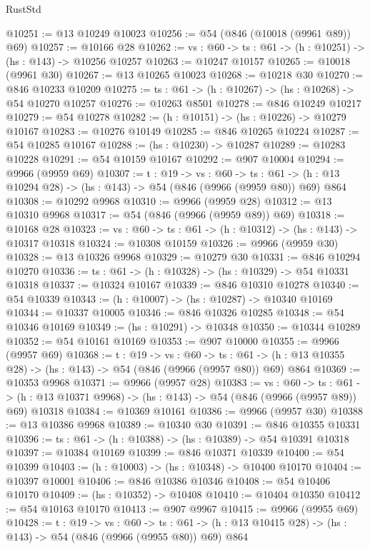 \begin{lexlean}{RustStd}
\begin{coremodule}
@10251 := @13 @10249 @10023
@10256 := @54 (@846 (@10018 (@9961 @89)) @69)
@10257 := @10166 @28
@10262 := {vs : @60} -> {ts : @61} -> (h : @10251) -> (hs : @143) -> @10256 @10257
@10263 := @10247 @10157
@10265 := @10018 (@9961 @30)
@10267 := @13 @10265 @10023
@10268 := @10218 @30
@10270 := @846 @10233 @10209
@10275 := {ts : @61} -> (h : @10267) -> (hs : @10268) -> @54 @10270 @10257
@10276 := @10263 @8501
@10278 := @846 @10249 @10217
@10279 := @54 @10278
@10282 := (h : @10151) -> (hs : @10226) -> @10279 @10167
@10283 := @10276 @10149
@10285 := @846 @10265 @10224
@10287 := @54 @10285 @10167
@10288 := (hs : @10230) -> @10287
@10289 := @10283 @10228
@10291 := @54 @10159 @10167
@10292 := @907 @10004
@10294 := @9966 (@9959 @69)
@10307 := {t : @19} ->
  {vs : @60} ->
  {ts : @61} -> (h : @13 @10294 @28) -> (hs : @143) -> @54 (@846 (@9966 (@9959 @80)) @69) @864
@10308 := @10292 @9968
@10310 := @9966 (@9959 @28)
@10312 := @13 @10310 @9968
@10317 := @54 (@846 (@9966 (@9959 @89)) @69)
@10318 := @10168 @28
@10323 := {vs : @60} -> {ts : @61} -> (h : @10312) -> (hs : @143) -> @10317 @10318
@10324 := @10308 @10159
@10326 := @9966 (@9959 @30)
@10328 := @13 @10326 @9968
@10329 := @10279 @30
@10331 := @846 @10294 @10270
@10336 := {ts : @61} -> (h : @10328) -> (hs : @10329) -> @54 @10331 @10318
@10337 := @10324 @10167
@10339 := @846 @10310 @10278
@10340 := @54 @10339
@10343 := (h : @10007) -> (hs : @10287) -> @10340 @10169
@10344 := @10337 @10005
@10346 := @846 @10326 @10285
@10348 := @54 @10346 @10169
@10349 := (hs : @10291) -> @10348
@10350 := @10344 @10289
@10352 := @54 @10161 @10169
@10353 := @907 @10000
@10355 := @9966 (@9957 @69)
@10368 := {t : @19} ->
  {vs : @60} ->
  {ts : @61} -> (h : @13 @10355 @28) -> (hs : @143) -> @54 (@846 (@9966 (@9957 @80)) @69) @864
@10369 := @10353 @9968
@10371 := @9966 (@9957 @28)
@10383 := {vs : @60} ->
  {ts : @61} -> (h : @13 @10371 @9968) -> (hs : @143) -> @54 (@846 (@9966 (@9957 @89)) @69) @10318
@10384 := @10369 @10161
@10386 := @9966 (@9957 @30)
@10388 := @13 @10386 @9968
@10389 := @10340 @30
@10391 := @846 @10355 @10331
@10396 := {ts : @61} -> (h : @10388) -> (hs : @10389) -> @54 @10391 @10318
@10397 := @10384 @10169
@10399 := @846 @10371 @10339
@10400 := @54 @10399
@10403 := (h : @10003) -> (hs : @10348) -> @10400 @10170
@10404 := @10397 @10001
@10406 := @846 @10386 @10346
@10408 := @54 @10406 @10170
@10409 := (hs : @10352) -> @10408
@10410 := @10404 @10350
@10412 := @54 @10163 @10170
@10413 := @907 @9967
@10415 := @9966 (@9955 @69)
@10428 := {t : @19} ->
  {vs : @60} ->
  {ts : @61} -> (h : @13 @10415 @28) -> (hs : @143) -> @54 (@846 (@9966 (@9955 @80)) @69) @864

\end{coremodule}
\end{lexlean}

